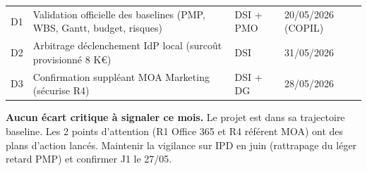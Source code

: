\documentclass[11pt,a4paper,oneside]{report}
\begin{document}
\renewcommand{\arraystretch}{1.3}
\begin{tabularx}{\textwidth}{C{0.6cm} Y L{3cm} C{2cm}}
\toprule
{}\th{\#} &  &  &  \\
\midrule
D1 & Validation officielle des baselines (PMP, WBS, Gantt, budget, risques) & DSI + PMO & 20/05/2026 (COPIL) \\
D2 & Arbitrage déclenchement IdP local (surcoût provisionné 8 K€) & DSI & 31/05/2026 \\
D3 & Confirmation suppléant MOA Marketing (sécurise R4) & DSI + DG & 28/05/2026 \\
\bottomrule
\end{tabularx}

\begin{reco}
\textbf{Aucun écart critique à signaler ce mois.} Le projet est dans sa trajectoire baseline. Les 2 points d'attention (R1 Office 365 et R4 référent MOA) ont des plans d'action lancés. Maintenir la vigilance sur IPD en juin (rattrapage du léger retard PMP) et confirmer J1 le 27/05.
\end{reco}
\end{document}
